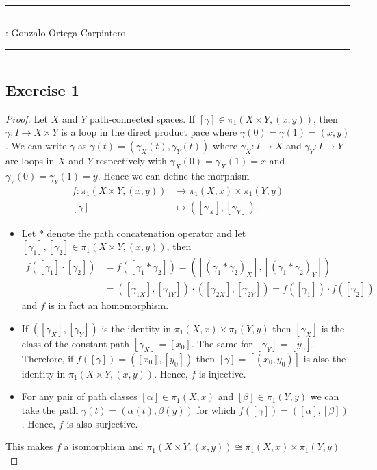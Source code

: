 \documentclass[11pt,a4paper]{article}
\begin{document}
\hrule\hrule
\vspace{1mm}


\vspace{1mm}

 : Gonzalo Ortega Carpintero
\vspace{2mm}

\hrule\hrule

\subsection*{Exercise 1}
\begin{proof}
Let $X$ and $Y$ path-connected spaces. If $[\gamma] \in \pi_1(X \times Y, (x, y)) $, then $ \gamma \colon I \to X \times Y $ is a loop in the direct product pace where $ \gamma(0) = \gamma(1) = (x,y) $. We can write $ \gamma $ as
$
  \gamma(t) = (\gamma_X(t), \gamma_Y(t))
$
where $ \gamma_X \colon I \to X $ and $ \gamma_Y \colon I \to Y $ are loops in $ X $ and $ Y $ respectively with $ \gamma_X(0) = \gamma_X(1) = x $ and $ \gamma_Y(0) = \gamma_Y(1) = y $. Hence we can define the morphism
\begin{align*}
  f \colon \pi_1(X \times Y, (x, y)) &\to \pi_1(X, x) \times \pi_1(Y,y) \\
  [\gamma] &\mapsto ([\gamma_X], [\gamma_Y]).
\end{align*}
\begin{itemize}
  \item Let $*$ denote the path concatenation operator and let $ [\gamma_1], [\gamma_2] \in \pi_1(X \times Y, (x, y)) $, then
  \begin{align*}
    f([\gamma_1]\cdot[\gamma_2]) &= f([\gamma_1 * \gamma_2]) = ([(\gamma_1 * \gamma_2)_X], [(\gamma_1 * \gamma_2)_Y]) \\
    &= ([\gamma_{1X}], [\gamma_{1Y}]) \cdot ([\gamma_{2X}], [\gamma_{2Y}]) = f([\gamma_1]) \cdot f([\gamma_2])
  \end{align*}
  and $f$ is in fact an homomorphism.

  \item If $ ([\gamma_X], [\gamma_Y]) $ is the identity in $\pi_1(X, x) \times \pi_1(Y,y)$ then $ [\gamma_X] $ is the class of the constant path $ [\gamma_X] = [x_0]$. The same for $ [\gamma_Y] = [y_0]$. Therefore, if $ f([\gamma]) = ([x_0], [y_0]) $ then $ [\gamma] = [(x_0, y_0)] $ is also the identity in $ \pi_1(X \times Y, (x, y)) $. Hence, $ f $ is injective.
  
  \item For any pair of path classes $ [\alpha] \in \pi_1(X, x) $ and $ [\beta] \in \pi_1(Y,y) $ we can take the path $ \gamma(t) =(\alpha(t), \beta(y)) $ for which $ f([\gamma]) = ([\alpha], [\beta]) $. Hence, $ f $ is also surjective.
\end{itemize}
This makes $ f $ a isomorphism and $ \pi_1(X \times Y, (x, y)) \cong \pi_1(X, x) \times \pi_1(Y,y) $
\end{proof}
\end{document}
